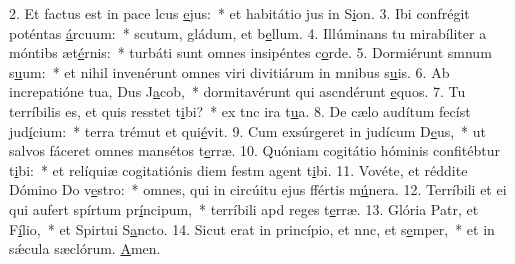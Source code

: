 2. Et factus est in pace lcus \uline{e}jus:~* et habitátio jus in S\uline{i}on.
3. Ibi confrégit poténtas \uline{á}rcuum:~* scutum, gládum, et b\uline{e}llum.
4. Illúminans tu mirabíliter a móntibs æt\uline{é}rnis:~* turbáti sunt omnes insipéntes c\uline{o}rde.
5. Dormiérunt smnum s\uline{u}um:~* et nihil invenérunt omnes viri divitiárum in mnibus s\uline{u}is.
6. Ab increpatióne tua, Dus J\uline{a}cob,~* dormitavérunt qui ascndérunt \uline{e}quos.
7. Tu terríbilis es, et quis resstet t\uline{i}bi?~* ex tnc ira t\uline{u}a.
8. De cælo audítum fecíst jud\uline{í}cium:~* terra trémut et qui\uline{é}vit.
9. Cum exsúrgeret in judícum D\uline{e}us,~* ut salvos fáceret omnes mansétos t\uline{e}rræ.
10. Quóniam cogitátio hóminis confitébtur t\uline{i}bi:~* et relíquiæ cogitatiónis diem festm agent t\uline{i}bi.
11. Vovéte, et réddite Dómino Do v\uline{e}stro:~* omnes, qui in circúitu ejus ffértis m\uline{ú}nera.
12. Terríbili et ei qui aufert spírtum pr\uline{í}ncipum,~* terríbili apd reges t\uline{e}rræ.
13. Glória Patr, et F\uline{í}lio,~* et Spirtui S\uline{a}ncto.
14. Sicut erat in princípio, et nnc, et s\uline{e}mper,~* et in sǽcula sæclórum. \uline{A}men.
